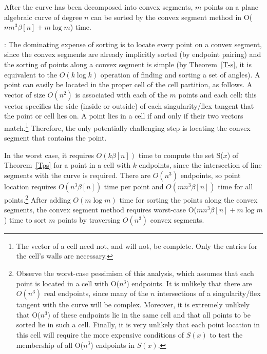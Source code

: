 \begin{theorem}
After the curve has been decomposed into convex segments,
$m$ points on a plane algebraic curve of degree $n$ can be sorted
by the convex segment method in O($m n^{3} \beta[n] + m\log m$) time.
\end{theorem}
%
:
The dominating expense of sorting is to locate every point on a convex segment,
since the convex segments are already implicitly sorted (by endpoint pairing) and 
the sorting of points along a convex segment is simple
(by Theorem~\ref{T-s}, it is equivalent to the $O(k \log k)$ operation of finding
and sorting a set of angles). 
A point can easily be located in the proper cell of the cell partition, as follows.
A vector of size $O(n^{2})$ is associated with each of the $m$ points and each
cell: this vector specifies the side (inside or outside) of each singularity/flex tangent
that the point or cell lies on.
A point lies in a cell if and only if their two vectors match.\footnote{The vector
	of a cell need not, and will not, be complete.  Only the entries for the
	cell's walls are necessary.}
Therefore, the only potentially challenging step is locating the convex segment
that contains the point.

In the worst case, it requires $O(k \beta[n])$ time to compute the set 
S($x$) of Theorem~\ref{Tps} for a point in a cell with $k$ endpoints, since
the intersection of line segments with the curve is required.
There are $O(n^{3})$ endpoints, so point location requires $O(n^{3}\beta[n])$ time per
point and $O(mn^{3}\beta[n])$ time for all points.\footnote{Observe the worst-case
	pessimism of this analysis, which assumes that each point is located in a cell
	with O($n^{3}$) endpoints.
	It is unlikely that there are $O(n^{3})$
	real endpoints, since many of the $n$ intersections of a singularity/flex
	tangent with the curve will be complex.  
	Moreover, it is extremely unlikely that O($n^{3}$)
	of these endpoints lie in the same cell and that all points to be sorted
	lie in such a cell.
	Finally, it is very unlikely that each point location in this cell will 
	require the more expensive conditions
	of $S(x)$ to test the membership of all O($n^{3}$) endpoints in $S(x)$.}
After adding $O(m \log m)$ time for sorting the points along the convex segments,
the convex segment method requires worst-case O($mn^{3}\beta[n] + m \log m$) 
time to sort $m$ points by traversing $O(n^{3})$ convex segments.
\QED

